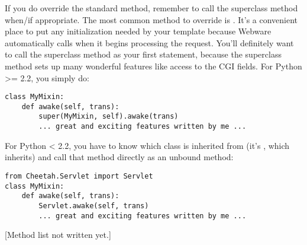 If you do override the standard method, remember to call the
superclass method when/if appropriate.  The most common method to override is
.  It's a convenient place to put any initialization needed 
by your template because Webware automatically calls  when it
begins processing the request.  You'll definitely want to call the superclass
 method as your first statement, because the superclass method
sets up many wonderful features like access to the CGI fields.  For 
Python >= 2.2, you simply do:
\begin{verbatim}
class MyMixin:
	def awake(self, trans):
		super(MyMixin, self).awake(trans)
		... great and exciting features written by me ...
\end{verbatim}
For Python < 2.2, you have to know which class  is inherited
from (it's , which  inherits) and call that method
directly as an unbound method:
\begin{verbatim}
from Cheetah.Servlet import Servlet
class MyMixin:
	def awake(self, trans):
		Servlet.awake(self, trans)
		... great and exciting features written by me ...
\end{verbatim}

[Method list not written yet.]


